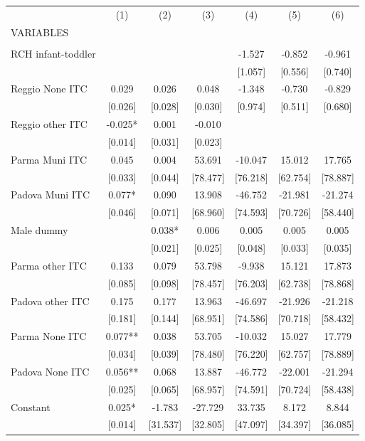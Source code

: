 \begin{tabular}{lcccccc} \hline
 & (1) & (2) & (3) & (4) & (5) & (6) \\
VARIABLES &  &  &  &  &  &  \\ \hline
 &  &  &  &  &  &  \\
RCH infant-toddler &  &  &  & -1.527 & -0.852 & -0.961 \\
 &  &  &  & [1.057] & [0.556] & [0.740] \\
Reggio None ITC & 0.029 & 0.026 & 0.048 & -1.348 & -0.730 & -0.829 \\
 & [0.026] & [0.028] & [0.030] & [0.974] & [0.511] & [0.680] \\
Reggio other ITC & -0.025* & 0.001 & -0.010 &  &  &  \\
 & [0.014] & [0.031] & [0.023] &  &  &  \\
Parma Muni ITC & 0.045 & 0.004 & 53.691 & -10.047 & 15.012 & 17.765 \\
 & [0.033] & [0.044] & [78.477] & [76.218] & [62.754] & [78.887] \\
Padova Muni ITC & 0.077* & 0.090 & 13.908 & -46.752 & -21.981 & -21.274 \\
 & [0.046] & [0.071] & [68.960] & [74.593] & [70.726] & [58.440] \\
Male dummy &  & 0.038* & 0.006 & 0.005 & 0.005 & 0.005 \\
 &  & [0.021] & [0.025] & [0.048] & [0.033] & [0.035] \\
Parma other ITC & 0.133 & 0.079 & 53.798 & -9.938 & 15.121 & 17.873 \\
 & [0.085] & [0.098] & [78.457] & [76.203] & [62.738] & [78.868] \\
Padova other ITC & 0.175 & 0.177 & 13.963 & -46.697 & -21.926 & -21.218 \\
 & [0.181] & [0.144] & [68.951] & [74.586] & [70.718] & [58.432] \\
Parma None ITC & 0.077** & 0.038 & 53.705 & -10.032 & 15.027 & 17.779 \\
 & [0.034] & [0.039] & [78.480] & [76.220] & [62.757] & [78.889] \\
Padova None ITC & 0.056** & 0.068 & 13.887 & -46.772 & -22.001 & -21.294 \\
 & [0.025] & [0.065] & [68.957] & [74.591] & [70.724] & [58.438] \\
Constant & 0.025* & -1.783 & -27.729 & 33.735 & 8.172 & 8.844 \\
 & [0.014] & [31.537] & [32.805] & [47.097] & [34.397] & [36.085] \\

\end{tabular}
